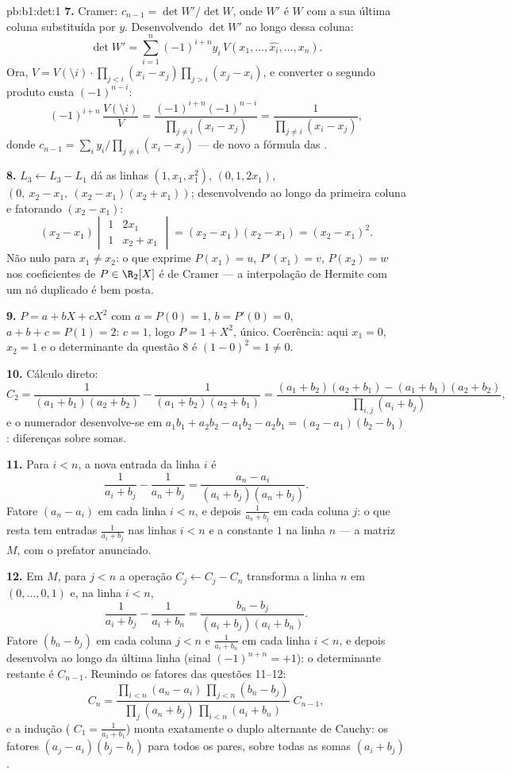 \begin{solution}{pb:b1:det:1}
\textbf{7.} Cramer: $c_{n-1} = \det W'/\det W$, onde $W'$ é $W$ com a sua última coluna
substituída por $y$. Desenvolvendo $\det W'$ ao longo dessa coluna:
\[
\det W' = \sum_{i=1}^n (-1)^{i+n} y_i\,V(x_1, \dots, \widehat{x_i},
\dots, x_n) .
\]
Ora, $V = V(\setminus i)\cdot\prod_{j<i}(x_i - x_j)\prod_{j>i}
(x_j - x_i)$, e converter o segundo produto custa $(-1)^{n-i}$:
\[
(-1)^{i+n}\,\frac{V(\setminus i)}{V}
= \frac{(-1)^{i+n}(-1)^{n-i}}{\prod_{j\neq i}(x_i - x_j)}
= \frac{1}{\prod_{j\neq i}(x_i - x_j)} ,
\]
donde $c_{n-1} = \sum_i y_i/\prod_{j \neq i}(x_i - x_j)$ --- de novo a fórmula das .

\textbf{8.} $L_3 \leftarrow L_3 - L_1$ dá as linhas $(1, x_1,
x_1^2)$, $(0, 1, 2x_1)$, $(0,\ x_2 - x_1,\ (x_2-x_1)(x_2+x_1))$; desenvolvendo ao
longo da primeira coluna e fatorando $(x_2 - x_1)$:
\[
(x_2 - x_1)\begin{vmatrix} 1 & 2x_1\\ 1 & x_2 + x_1
\end{vmatrix} = (x_2 - x_1)(x_2 - x_1) = (x_2 - x_1)^2 .
\]
Não nulo para $x_1 \neq x_2$: o  que exprime $P(x_1) = u$, $P'(x_1) = v$,
$P(x_2) = w$ nos coeficientes de $P \in \R_2[X]$ é de Cramer --- a interpolação de
Hermite com um nó duplicado é bem posta.

\textbf{9.} $P = a + bX + cX^2$ com $a = P(0) = 1$, $b = P'(0)
= 0$, $a + b + c = P(1) = 2$: $c = 1$, logo $P = 1 + X^2$,
único. Coerência: aqui $x_1 = 0$, $x_2 = 1$ e o determinante da
questão 8 é $(1 - 0)^2 = 1 \neq 0$.

\textbf{10.} Cálculo direto:
\[
C_2 = \frac{1}{(a_1+b_1)(a_2+b_2)} - \frac{1}{(a_1+b_2)(a_2+b_1)}
= \frac{(a_1+b_2)(a_2+b_1) - (a_1+b_1)(a_2+b_2)}
{\prod_{i,j}(a_i+b_j)} ,
\]
e o numerador desenvolve-se em $a_1b_1 + a_2b_2 - a_1b_2 - a_2b_1
= (a_2 - a_1)(b_2 - b_1)$: diferenças sobre somas.

\textbf{11.} Para $i < n$, a nova entrada da linha $i$ é
\[
\frac{1}{a_i + b_j} - \frac{1}{a_n + b_j}
= \frac{a_n - a_i}{(a_i + b_j)(a_n + b_j)} .
\]
Fatore $(a_n - a_i)$ em cada linha $i < n$, e depois $\frac1{a_n + b_j}$ em cada coluna
$j$: o que resta tem entradas $\frac1{a_i + b_j}$ nas linhas $i < n$ e a constante
$1$ na linha $n$ --- a matriz $M$, com o prefator anunciado.

\textbf{12.} Em $M$, para $j < n$ a operação $C_j \leftarrow
C_j - C_n$ transforma a
linha $n$ em $(0, \dots, 0, 1)$ e, na linha $i < n$,
\[
\frac{1}{a_i + b_j} - \frac{1}{a_i + b_n}
= \frac{b_n - b_j}{(a_i + b_j)(a_i + b_n)} .
\]
Fatore $(b_n - b_j)$ em cada coluna $j < n$ e $\frac1{a_i +
b_n}$ em cada linha $i < n$, e
depois desenvolva ao longo da última linha (sinal $(-1)^{n+n} = +1$): o
determinante restante é $C_{n-1}$. Reunindo os fatores das questões
11--12:
\[
C_n = \frac{\prod_{i<n}(a_n - a_i)\,\prod_{j<n}(b_n - b_j)}
{\prod_{j}(a_n + b_j)\,\prod_{i<n}(a_i + b_n)}\;C_{n-1},
\]
e a indução ( $C_1 = \frac1{a_1+b_1}$) monta exatamente o duplo alternante de
Cauchy: os fatores $(a_j - a_i)(b_j
- b_i)$ para todos os pares, sobre todas as somas
$(a_i + b_j)$.


\end{solution}
